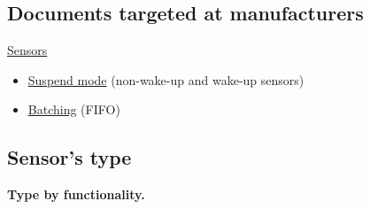 \documentclass{article}
\begin{document}
\subsection{Documents targeted at manufacturers}

\href{https://source.android.com/devices/sensors/index.html}{Sensors}
\begin{itemize}
\item \href{https://source.android.com/devices/sensors/suspend-mode.html}
  {Suspend mode} (non-wake-up and wake-up sensors)
  
\item \href{https://source.android.com/devices/sensors/batching.html}
  {Batching} (FIFO)
\end{itemize}


\subsection{Sensor's type}

\textbf{Type by functionality.} 
\vspace*{.5cm}
\end{document}
